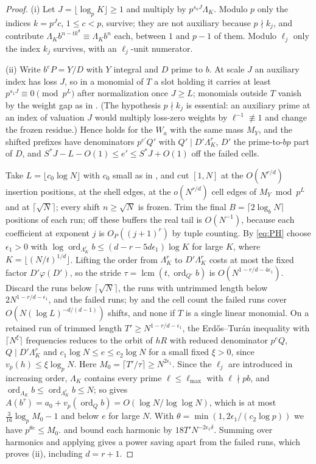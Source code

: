 \documentclass[11pt]{article}
\DeclareMathOperator{\ord}{ord}
\DeclareMathOperator{\lcm}{lcm}
\begin{document}
\begin{proof}
(i) Let $J=\lfloor\log_pK\rfloor\ge1$ and multiply by $p^{s_aJ}\Lambda_K$. Modulo $p$ only the indices $k=p^Jc$, $1\le c<p$, survive;
they are not auxiliary because $p\nmid k_j$, and contribute $\Lambda_Kb^{n-tk^d}\equiv\Lambda_Kb^n$ each, between $1$ and $p-1$ of them.
Modulo $\ell_j$ only the index $k_j$ survives, with an $\ell_j$-unit numerator.

(ii) Write $b^eP=Y/D$ with $Y$ integral and $D$ prime to $b$. At scale $J$ an auxiliary index has loss $J$, so in a monomial
of $T$ a slot holding it carries at least $p^{s_1J}\equiv0\pmod{p^L}$ after normalization once $J\ge L$; monomials outside $T$
vanish by the weight gap as in . (The hypothesis $p\nmid k_j$ is essential: an auxiliary prime at an index
of valuation $J$ would multiply loss-zero weights by $\ell^{-1}\not\equiv1$ and change the frozen residue.) Hence
 holds for the $W_a$ with the same mass $M_Y$, and the shifted prefixes have denominators $p^{e'}Q'$ with
$Q'\mid D'\Lambda_K^r$, $D'$ the prime-to-$bp$ part of $D$, and $S^*J-L-O(1)\le e'\le S^*J+O(1)$ off the failed cells.

Take $L=\lfloor c_0\log N\rfloor$ with $c_0$ small as in \cite[Theorem~7.24]{PaperVIIv2}, and cut $[1,N]$ at the $O(N^{r/d})$
insertion positions, at the shell edges, at the $o(N^{r/d})$ cell edges of $M_Y\bmod p^L$ and at $\lceil\sqrt N\rceil$; every shift
$n\ge\sqrt N$ is frozen. Trim the final $B=\lceil2\log_bN\rceil$ positions of each run; off these buffers the real tail is $O(N^{-1})$,
because each coefficient at exponent $j$ is $O_P((j+1)^r)$ by tuple counting. By \eqref{eq:PH} choose $\epsilon_1>0$ with
$\log\ord_{\Lambda_K^r}b\le(d-r-5d\epsilon_1)\log K$ for large $K$, where $K=\lfloor(N/t)^{1/d}\rfloor$. Lifting the order from $\Lambda_K^r$ to
$D'\Lambda_K^r$ costs at most the fixed factor $D'\varphi(D')$, so the stride $\tau=\lcm(t,\ord_{Q'}b)$ is $O(N^{1-r/d-4\epsilon_1})$. Discard
the runs below $\lceil\sqrt N\rceil$, the runs with untrimmed length below $2N^{1-r/d-\epsilon_1}$, and the failed runs; by
 and the cell count the failed runs cover $O(N(\log L)^{-d/(d-1)})$ shifts, and none if $T$ is a
single linear monomial. On a retained run of trimmed length $T'\ge N^{1-r/d-\epsilon_1}$, the Erd\H{o}s--Tur\'an inequality with
$\lceil N^\xi\rceil$ frequencies reduces to the orbit of $hR$ with reduced denominator $p^eQ$, $Q\mid D'\Lambda_K^r$ and
$c_1\log N\le e\le c_2\log N$ for a small fixed $\xi>0$, since $v_p(h)\le\xi\log_pN$. Here $M_0=\lceil T'/\tau\rceil\ge N^{2\epsilon_1}$. Since the
$\ell_j$ are introduced in increasing order, $\Lambda_K$ contains every prime $\ell\le\ell_{\max}$ with $\ell\nmid pb$, and
$\ord_{\Lambda_K}b\le\ord_{\Lambda_K^r}b\le N$; so  gives $A(b^\tau)=a_0+v_p(\ord_Qb)=O(\log N/\log\log N)$, which is
at most $\frac3{16}\log_pM_0-1$ and below $e$ for large $N$. With $\theta=\min(1,2\epsilon_1/(c_2\log p))$ we have $p^{\theta e}\le M_0$.
 and  bound each harmonic by $18T'N^{-2\epsilon_1\delta}$. Summing over harmonics and
applying  gives a power saving apart from the failed runs, which proves (ii), including $d=r+1$.


\end{proof}
\end{document}
